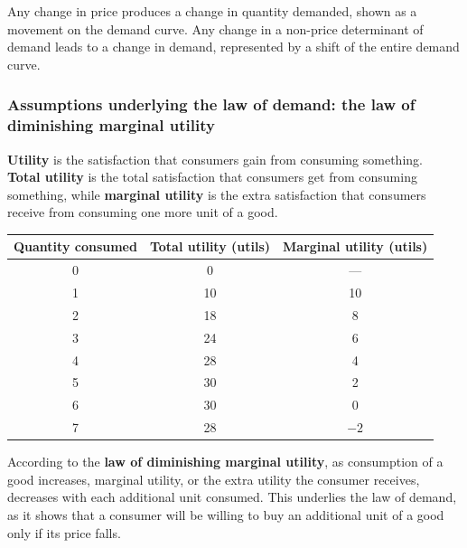 \documentclass[a4paper,12pt]{article}
\newcommand{\needbold}[1]{\textcolor{red!70!black}{\textbf{#1}}}
\begin{document}
Any change in price produces a change in quantity demanded, shown as a movement on the demand curve. Any change in a non-price determinant
of demand leads to a change in demand, represented by a shift of the entire demand curve.
\subsubsection*{Assumptions underlying the law of demand: the law of diminishing marginal utility}
\needbold{Utility} is the satisfaction that consumers gain from consuming something. \\
\needbold{Total utility} is the total satisfaction that consumers get from consuming something, while \needbold{marginal utility} is the extra satisfaction that consumers receive from consuming one more unit of a good.
\begin{center}
\begin{tabular}{c|c|c}
\toprule
\textbf{Quantity consumed} & \textbf{Total utility (utils)} & \textbf{Marginal utility (utils)} \\
\midrule
0 & 0 & --- \\
1 & 10 & 10 \\
2 & 18 & 8 \\
3 & 24 & 6 \\
4 & 28 & 4 \\
5 & 30 & 2 \\
6 & 30 & 0 \\
7 & 28 & $-2$ \\
\bottomrule
\end{tabular}
\end{center}
According to the \needbold{law of diminishing marginal utility}, as consumption of a good increases, marginal utility, or the extra utility the consumer receives, decreases with each additional unit consumed. This underlies the law of demand, as it shows that a consumer will be willing to buy an additional unit of a good only if its price falls.
\end{document}
